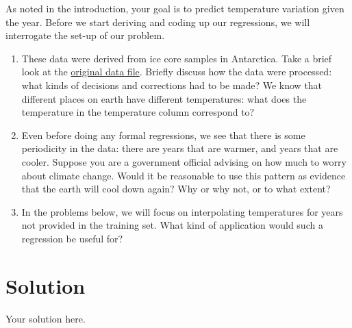 \documentclass[submit]{harvardml}
\newenvironment{solution}
  {\color{blue}\section*{Solution}}
{}
\begin{document}
\begin{problem}
As noted in the introduction, your goal is to predict temperature
variation given the year.  Before we start deriving and coding up our
regressions, we will interrogate the set-up of our problem.  

\begin{enumerate}
  \item These data were derived from ice core samples in Antarctica.
    Take a brief look at the
    \href{https://www.ncei.noaa.gov/pub/data/paleo/icecore/antarctica/epica_domec/edc3deuttemp2007.txt}{original
      data file}.  Briefly discuss how the data were processed: what kinds of
    decisions and corrections had to be made?  We know that different
    places on earth have different temperatures: what does the
    temperature in the temperature column correspond to?
        
  \item Even before doing any formal regressions, we see that there is
    some periodicity in the data: there are years that are warmer, and
    years that are cooler.  Suppose you are a government official
    advising on how much to worry about climate change.  Would it be
    reasonable to use this pattern as evidence that the earth will
    cool down again?  Why or why not, or to what extent?


  \item In the problems below, we will focus on interpolating
    temperatures for years not provided in the training set.  What
    kind of application would such a regression be useful for?

\end{enumerate}
  
\end{problem}

\begin{solution}
	Your solution here.
\end{solution}

\end{document}
